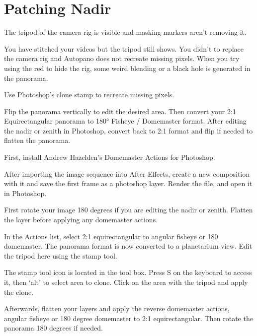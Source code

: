 \section{Patching Nadir}
\pagecolor{white}
\label{chap:48}
\begin{fullwidth}

\problem

{\large The tripod of the camera rig is visible and masking markers aren’t removing it. \par}

You have stitched your videos but the tripod still shows. You didn't \textbf{} to replace the camera rig and Autopano does not recreate missing pixels. When you try using the red \textbf{} to hide the rig, some weird blending or a black hole is generated in the panorama.

\solution

{\large Use Photoshop’s clone stamp to recreate missing pixels. \par}

Flip the panorama vertically to edit the desired area. Then convert your 2:1 Equirectangular panorama to 180° Fisheye / Domemaster format. After editing the nadir or zenith in Photoshop, convert back to 2:1 format and flip if needed to flatten the panorama.

First, install Andrew Hazelden's Domemaster Actions for Photoshop.

After importing the image sequence into After Effects, create a new composition with it and save the first frame as a photoshop layer. Render the file, and open it in Photoshop.


First rotate your image 180 degrees if you are editing the nadir or zenith. Flatten the layer before applying any domemaster actions.


In the Actions list, select 2:1 equirectangular to angular fisheye or 180 domemaster. The panorama format is now converted to a planetarium view. Edit the tripod here using the stamp tool.


\tip The stamp tool icon is located in the tool box. Press S on the keyboard to access it, then ‘alt’ to select area to clone. Click on the area with the tripod and apply the clone.

Afterwards, flatten your layers and apply the reverse domemaster actions, angular fisheye or 180 degree domemaster to 2:1 equirectangular. Then rotate the panorama 180 degrees if needed. 


\end{fullwidth}
